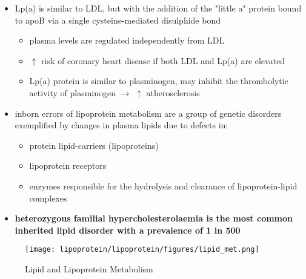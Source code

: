 \documentclass{scrartcl}
\begin{document}
\begin{enumerate}
\begin{itemize}
\item Lp(a) is similar to LDL, but with the addition of the "little a"
protein bound to apoB via a single cysteine-mediated disulphide
bond
\begin{itemize}
\item plasma levels are regulated independently from LDL
\item \(\uparrow\) risk of coronary heart disease if both LDL and Lp(a) are
elevated
\item Lp(a) protein is similar to plasminogen, may inhibit the
thrombolytic activity of plasminogen \(\to\) \(\uparrow\) atherosclerosis
\end{itemize}
\item inborn errors of lipoprotein metabolism are a group of genetic
disorders exemplified by changes in plasma lipids due to defects in:
\begin{itemize}
\item protein lipid-carriers (lipoproteins)
\item lipoprotein receptors
\item enzymes responsible for the hydrolysis and clearance of
lipoprotein-lipid complexes
\end{itemize}
\item \textbf{heterozygous familial hypercholesterolaemia is the most common}
\textbf{inherited lipid disorder with a prevalence of 1 in 500}
\end{itemize}

\begin{figure}[htbp]
\centering
\texttt{[image: lipoprotein/lipoprotein/figures/lipid\_met.png]}
\caption{\label{fig:orgf647121}Lipid and Lipoprotein Metabolism}
\end{figure}
\end{enumerate}
\end{document}
